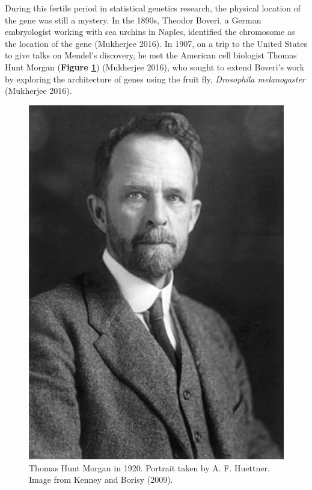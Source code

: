 \documentclass[
]{book}
\begin{document}
During this fertile period in statistical genetics research, the physical location of the gene was still a mystery. In the 1890s, Theodor Boveri, a German embryologist working with sea urchins in Naples, identified the chromosome as the location of the gene (Mukherjee 2016). In 1907, on a trip to the United States to give talks on Mendel's discovery, he met the American cell biologist Thomas Hunt Morgan (\textbf{Figure \ref{fig:morgan}}) (Mukherjee 2016), who sought to extend Boveri's work by exploring the architecture of genes using the fruit fly, \emph{Drosophila melanogaster} (Mukherjee 2016).



\begin{figure}

\includegraphics[width=1\linewidth]{figs/introduction/Thomas_Morgan} \hfill{}

\caption{Thomas Hunt Morgan in 1920. Portrait taken by A. F. Huettner. Image from Kenney and Borisy (2009).}\label{fig:morgan}
\end{figure}
\end{document}
